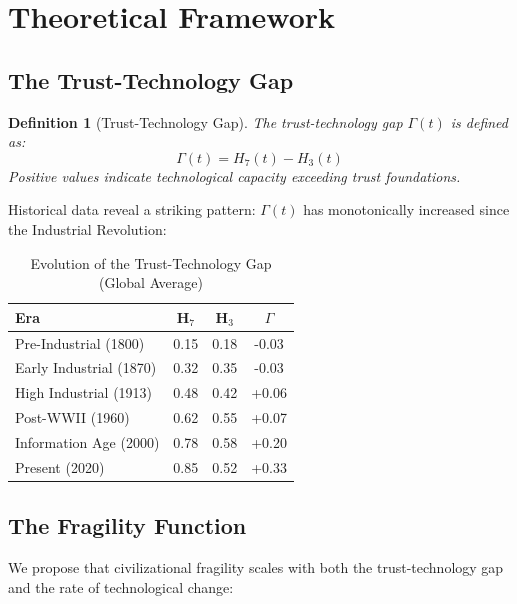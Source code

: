 \documentclass[11pt,a4paper]{article}
\newtheorem{definition}{Definition}
\begin{document}
\section{Theoretical Framework}

\subsection{The Trust-Technology Gap}

\begin{definition}[Trust-Technology Gap]
The trust-technology gap $\Gamma(t)$ is defined as:
\begin{equation}
\Gamma(t) = H_7(t) - H_3(t)
\end{equation}
Positive values indicate technological capacity exceeding trust foundations.
\end{definition}

Historical data reveal a striking pattern: $\Gamma(t)$ has monotonically increased since the Industrial Revolution:

\begin{table}[h]
\centering
\begin{tabular}{lccc}
\toprule
\textbf{Era} & \textbf{H$_7$} & \textbf{H$_3$} & \textbf{$\Gamma$} \\
\midrule
Pre-Industrial (1800) & 0.15 & 0.18 & -0.03 \\
Early Industrial (1870) & 0.32 & 0.35 & -0.03 \\
High Industrial (1913) & 0.48 & 0.42 & +0.06 \\
Post-WWII (1960) & 0.62 & 0.55 & +0.07 \\
Information Age (2000) & 0.78 & 0.58 & +0.20 \\
Present (2020) & 0.85 & 0.52 & +0.33 \\
\bottomrule
\end{tabular}
\caption{Evolution of the Trust-Technology Gap (Global Average)}
\end{table}

\subsection{The Fragility Function}

We propose that civilizational fragility scales with both the trust-technology gap and the rate of technological change:
\end{document}
